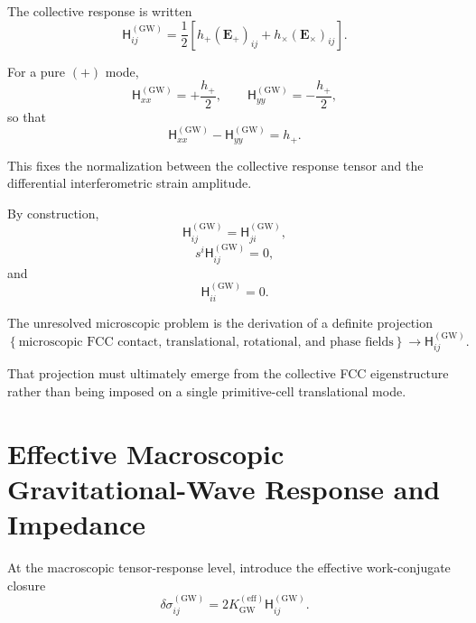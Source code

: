 The collective response is written
\begin{equation}
    \mathsf{H}_{ij}^{(\mathrm{GW})} = \frac{1}{2} \left[ h_{+}(\mathbf{E}_{+})_{ij} + h_{\times}(\mathbf{E}_{\times})_{ij} \right].
\end{equation}

For a pure $(+)$ mode,
\begin{equation}
    \mathsf{H}_{xx}^{(\mathrm{GW})} = +\frac{h_{+}}{2}, \qquad \mathsf{H}_{yy}^{(\mathrm{GW})} = -\frac{h_{+}}{2},
\end{equation}
so that
\begin{equation}
    \mathsf{H}_{xx}^{(\mathrm{GW})} - \mathsf{H}_{yy}^{(\mathrm{GW})} = h_{+}.
\end{equation}

This fixes the normalization between the collective response tensor and the differential interferometric strain amplitude.

By construction,
\begin{equation}
    \mathsf{H}_{ij}^{(\mathrm{GW})} = \mathsf{H}_{ji}^{(\mathrm{GW})},
\end{equation}
\begin{equation}
    s^i\mathsf{H}_{ij}^{(\mathrm{GW})} = 0,
\end{equation}
and
\begin{equation}
    \mathsf{H}_{ii}^{(\mathrm{GW})} = 0.
\end{equation}

The unresolved microscopic problem is the derivation of a definite projection
\begin{equation}
    \left\{ \text{microscopic FCC contact, translational, rotational, and phase fields} \right\} \longrightarrow \mathsf{H}_{ij}^{(\mathrm{GW})}.
\end{equation}

That projection must ultimately emerge from the collective FCC eigenstructure rather than being imposed on a single primitive-cell translational mode.

\section{Effective Macroscopic Gravitational-Wave Response and Impedance}

At the macroscopic tensor-response level, introduce the effective work-conjugate closure
\begin{equation}
    \delta\sigma_{ij}^{(\mathrm{GW})} = 2K_{\mathrm{GW}}^{(\mathrm{eff})} \mathsf{H}_{ij}^{(\mathrm{GW})}.
\end{equation}

